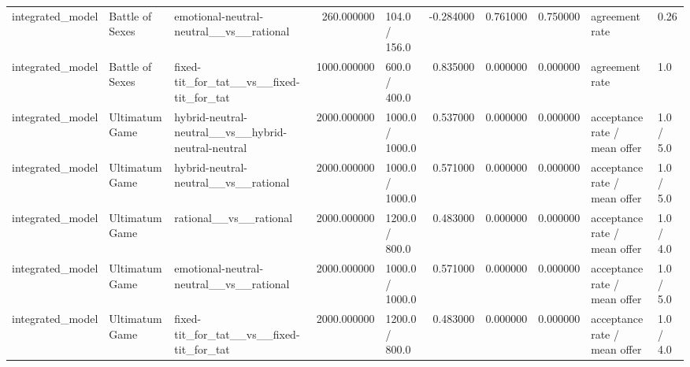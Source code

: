 \begin{tabular}{lllrlrrrll}
integrated\_model & Battle of Sexes & emotional-neutral-neutral\_\_vs\_\_rational & 260.000000 & 104.0 / 156.0 & -0.284000 & 0.761000 & 0.750000 & agreement rate & 0.26 \\
integrated\_model & Battle of Sexes & fixed-tit\_for\_tat\_\_vs\_\_fixed-tit\_for\_tat & 1000.000000 & 600.0 / 400.0 & 0.835000 & 0.000000 & 0.000000 & agreement rate & 1.0 \\
integrated\_model & Ultimatum Game & hybrid-neutral-neutral\_\_vs\_\_hybrid-neutral-neutral & 2000.000000 & 1000.0 / 1000.0 & 0.537000 & 0.000000 & 0.000000 & acceptance rate / mean offer & 1.0 / 5.0 \\
integrated\_model & Ultimatum Game & hybrid-neutral-neutral\_\_vs\_\_rational & 2000.000000 & 1000.0 / 1000.0 & 0.571000 & 0.000000 & 0.000000 & acceptance rate / mean offer & 1.0 / 5.0 \\
integrated\_model & Ultimatum Game & rational\_\_vs\_\_rational & 2000.000000 & 1200.0 / 800.0 & 0.483000 & 0.000000 & 0.000000 & acceptance rate / mean offer & 1.0 / 4.0 \\
integrated\_model & Ultimatum Game & emotional-neutral-neutral\_\_vs\_\_rational & 2000.000000 & 1000.0 / 1000.0 & 0.571000 & 0.000000 & 0.000000 & acceptance rate / mean offer & 1.0 / 5.0 \\
integrated\_model & Ultimatum Game & fixed-tit\_for\_tat\_\_vs\_\_fixed-tit\_for\_tat & 2000.000000 & 1200.0 / 800.0 & 0.483000 & 0.000000 & 0.000000 & acceptance rate / mean offer & 1.0 / 4.0 \\
\bottomrule
\end{tabular}
